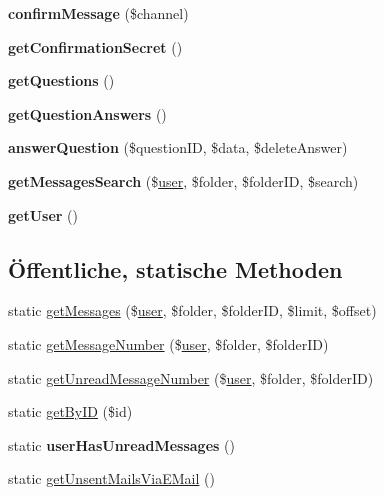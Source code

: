 \begin{DoxyCompactItemize}
\item 
\mbox{\label{class_message_a613dc5ddb84fa40b520850da2d960c1c}} 
{\bfseries confirm\+Message} (\$channel)
\item 
\mbox{\label{class_message_abd17b31860140ca258a889bae541f760}} 
{\bfseries get\+Confirmation\+Secret} ()
\item 
\mbox{\label{class_message_a90985e4501b01eedda7a5c857fff6eee}} 
{\bfseries get\+Questions} ()
\item 
\mbox{\label{class_message_a8e510c1f5d8d640cf844256a1929e08f}} 
{\bfseries get\+Question\+Answers} ()
\item 
\mbox{\label{class_message_adc7a3825887e5420f0138d5ac9cd8640}} 
{\bfseries answer\+Question} (\$question\+ID, \$data, \$delete\+Answer)
\item 
\mbox{\label{class_message_ad3697397f2ae7b08d35bc715092650db}} 
{\bfseries get\+Messages\+Search} (\$\mbox{\hyperlink{classuser}{user}}, \$folder, \$folder\+ID, \$search)
\item 
\mbox{\label{class_message_ab72e34d5a47a38d6910ec53caf64cce8}} 
{\bfseries get\+User} ()
\end{DoxyCompactItemize}
\subsection*{Öffentliche, statische Methoden}
\begin{DoxyCompactItemize}
\item 
static \mbox{\hyperlink{class_message_a674b7262580f0eed9a41903828bca18e}{get\+Messages}} (\$\mbox{\hyperlink{classuser}{user}}, \$folder, \$folder\+ID, \$limit, \$offset)
\item 
static \mbox{\hyperlink{class_message_a81044d1762c4fad9c128eb00368aab11}{get\+Message\+Number}} (\$\mbox{\hyperlink{classuser}{user}}, \$folder, \$folder\+ID)
\item 
static \mbox{\hyperlink{class_message_a2f4a908e9cb2bab9cedf822e5239f9d0}{get\+Unread\+Message\+Number}} (\$\mbox{\hyperlink{classuser}{user}}, \$folder, \$folder\+ID)
\item 
static \mbox{\hyperlink{class_message_a032f1d597ab27c54755d0ca84da767ee}{get\+By\+ID}} (\$id)
\item 
\mbox{\label{class_message_a2a400d7b315fede21d5a0798315b7471}} 
static {\bfseries user\+Has\+Unread\+Messages} ()
\item 
static \mbox{\hyperlink{class_message_ab9917c2cd712afd24c9986bf937b311e}{get\+Unsent\+Mails\+Via\+E\+Mail}} ()
\end{DoxyCompactItemize}


